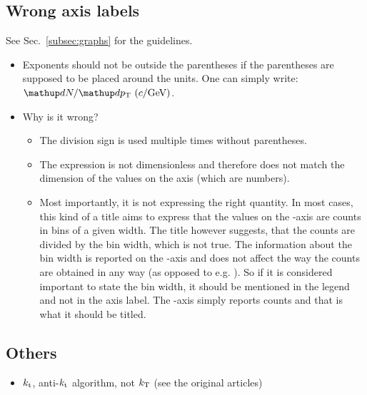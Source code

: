\documentclass[12pt,a4paper]{article}
\begin{document}
\subsection{Wrong axis labels}

See Sec.~\ref{subsec:graphs} for the guidelines.

\begin{itemize}

\item {}

Exponents should not be outside the parentheses if the parentheses are supposed to be placed around the units. One can simply write: \( \dd N/\dd p_\tn{T}\ (c/\tn{GeV}) \).

\item {}

Why is it wrong?

\begin{itemize}
\item The division sign is used multiple times without parentheses.
\item The expression is not dimensionless and therefore does not match the dimension of the values on the axis (which are numbers).
\item Most importantly, it is not expressing the right quantity. In most cases, this kind of a title aims to express that the values on the -axis are counts in bins of a given width. The title however suggests, that the counts are divided by the bin width, which is not true. The information about the bin width is reported on the -axis and does not affect the way the counts are obtained in any way (as opposed to e.g. ). So if it is considered important to state the bin width, it should be mentioned in the legend and not in the axis label. The -axis simply reports counts and that is what it should be titled.
\end{itemize}
\end{itemize}

\subsection{Others}

\begin{itemize}

\item \(k_{\textnormal{t}}\), anti-\(k_{\textnormal{t}}\) algorithm, not \(k_{\textnormal{T}}\) (see the original articles)

\end{itemize}
\end{document}
